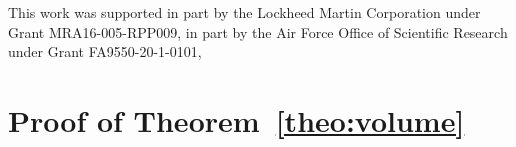 \documentclass[Afour,sageh,times]{sagej}
\begin{document}

\begin{acks}
This work was supported in part by the Lockheed Martin
Corporation under Grant MRA16-005-RPP009, in part by the Air Force Office
of Scientific Research under Grant FA9550-20-1-0101,
\end{acks}




\appendix
 \section{Proof of Theorem~\ref{theo:volume}}
 \label{app:volume}

\end{document}
